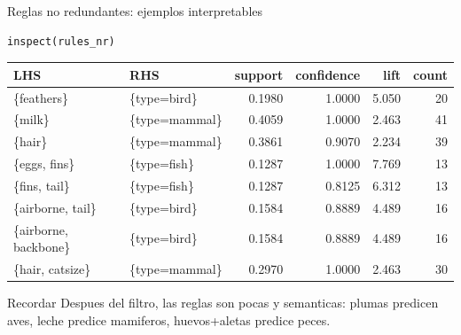\documentclass[10pt,aspectratio=169]{beamer}
\begin{document}
\begin{frame}[fragile]{Reglas no redundantes: ejemplos interpretables}
\begin{lstlisting}[style=rcode]
inspect(rules_nr)
\end{lstlisting}

\vspace{0.1cm}
\scriptsize
\begin{tabular}{llrrrr}
\toprule
LHS & RHS & support & confidence & lift & count \\
\midrule
\{feathers\} & \{type=bird\} & 0.1980 & 1.0000 & 5.050 & 20 \\
\{milk\} & \{type=mammal\} & 0.4059 & 1.0000 & 2.463 & 41 \\
\{hair\} & \{type=mammal\} & 0.3861 & 0.9070 & 2.234 & 39 \\
\{eggs, fins\} & \{type=fish\} & 0.1287 & 1.0000 & 7.769 & 13 \\
\{fins, tail\} & \{type=fish\} & 0.1287 & 0.8125 & 6.312 & 13 \\
\{airborne, tail\} & \{type=bird\} & 0.1584 & 0.8889 & 4.489 & 16 \\
\{airborne, backbone\} & \{type=bird\} & 0.1584 & 0.8889 & 4.489 & 16 \\
\{hair, catsize\} & \{type=mammal\} & 0.2970 & 1.0000 & 2.463 & 30 \\
\bottomrule
\end{tabular}

\begin{alertblock}{Recordar}
Despues del filtro, las reglas son pocas y semanticas: plumas predicen aves, leche predice mamiferos, huevos+aletas predice peces.
\end{alertblock}
\end{frame}

\end{document}
